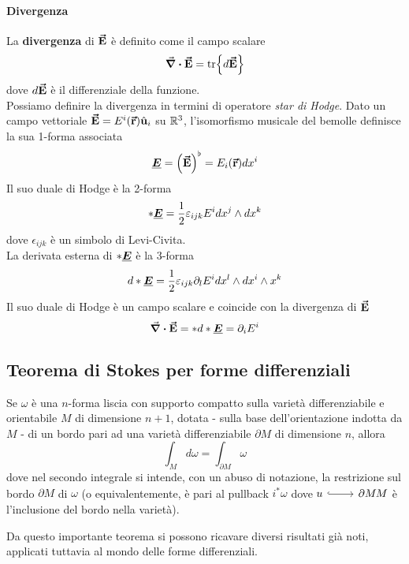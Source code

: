 \paragraph{Divergenza}
La \textbf{divergenza} di $\vb*{\va{E}}$ è definito come il campo scalare
\begin{equation}
	\div{\vb*{\va{E}}}=\tr{d\vb*{\va{E}}}
\end{equation}
dove $d\vb*{\va{E}}$ è il differenziale della funzione.\\
Possiamo definire la divergenza in termini di operatore \textit{star di Hodge}. Dato un campo vettoriale $\vb*{\va{E}}=E^i(\vb*{\va{r}})\hat{\mathbf{u}}_i$ su $\mathbb{R}^3$, l'isomorfismo musicale del bemolle definisce la sua 1-forma associata
\begin{equation*}
	\vb*{\underline{E}}=\left(\vb*{\va{E}}\right)^\flat=E_i(\vb*{\va{r}})dx^i
\end{equation*}
Il suo duale di Hodge è la 2-forma
\begin{equation*}
	\ast\vb*{\underline{E}}=\frac{1}{2}\varepsilon_{ijk}E^idx^j\wedge dx^k
\end{equation*}
dove $\epsilon_{ijk}$ è un simbolo di Levi-Civita.\\
La derivata esterna di $\ast\vb*{\underline{E}}$ è la 3-forma
\begin{equation*}
	d\ast\vb*{\underline{E}}=\frac{1}{2}\varepsilon_{ijk}\partial_lE^idx^{l}\wedge dx^i\wedge x^k
\end{equation*}
Il suo duale di Hodge è un campo scalare e coincide con la divergenza di $\vb*{\va{E}}$  
\begin{equation}
	\div{\vb*{\va{E}}}=\ast d\ast\vb*{\underline{E}}=\partial_i E^i
\end{equation}
\subsection{Teorema di Stokes per forme differenziali}
\begin{theoremaqed}
	Se $\omega$ è una $n$-forma liscia con supporto compatto sulla varietà differenziabile e orientabile $M$ di dimensione $n+1$, dotata - sulla base dell'orientazione indotta da $M$ - di un bordo pari ad una varietà differenziabile $\partial M$ di dimensione $n$, allora
	\begin{equation*}
		\int_{M}d\omega=\int_{\partial M}\omega
	\end{equation*}
dove nel secondo integrale si intende, con un abuso di notazione, la restrizione sul bordo $\partial M$ di $\omega$ (o equivalentemente, è pari al pullback $i^{\ast}\omega$ dove $\incl{u}{\partial M}{M}$ è l'inclusione del bordo nella varietà).
\end{theoremaqed}
Da questo importante teorema si possono ricavare diversi risultati già noti, applicati tuttavia al mondo delle forme differenziali.
